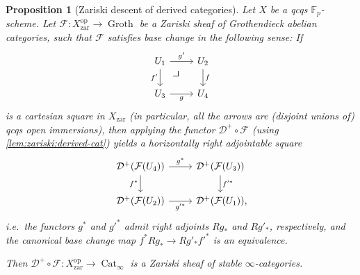 \documentclass{article}
\theoremstyle{definition}
\theoremstyle{definition}
\theoremstyle{definition}
\theoremstyle{plain}
\theoremstyle{plain}
\theoremstyle{plain}
\theoremstyle{plain}
\theoremstyle{plain}
\theoremstyle{plain}
\newtheorem{prop}[defn]{Proposition}
\theoremstyle{plain}
\theoremstyle{plain}
\theoremstyle{remark}
\theoremstyle{remark}
\theoremstyle{plain}
\theoremstyle{plain}
\theoremstyle{plain}
\theoremstyle{plain}
\theoremstyle{plain}
\newcommand{\Fp}{\mathbb{F}_p}
\newcommand{\op}[1]{#1^{\operatorname{op}}}
\newcommand{\cartsymb}{\arrow[dr, phantom,"\scalebox{1.5}{\color{black}$\lrcorner$}", near start, color=black]}
\newcommand{\Cat}[1]{\mathcal{#1}}
\newcommand{\CatInf}{\operatorname{Cat}_{\infty}}
\newcommand{\Groth}{\operatorname{Groth}}
\newcommand{\zar}{\operatorname{zar}}
\begin{document}
\begin{prop}[Zariski descent of derived categories] \label{lem:zariski:descent-on-derived}
    Let $X$ be a qcqs $\Fp$-scheme.
    Let $\Cat F \colon \op{X}_{\zar} \to \Groth$ 
    be a Zariski sheaf of Grothendieck abelian categories,
    such that $\Cat F$ satisfies base change in the following sense:
    If
    \[\begin{tikzcd}
        U_1 \ar[r, "g'"] \ar[d, "f'"'] \cartsymb & U_2 \ar[d, "f"] \\
        U_3 \ar[r, "g"'] & U_4
    \end{tikzcd}\]
    is a cartesian square in $X_{\zar}$ (in particular, all the arrows are (disjoint unions of) qcqs open immersions),
    then applying the functor $\Cat D^+ \circ \Cat F$ (using \cref{lem:zariski:derived-cat}) yields a horizontally right adjointable square
    \[\begin{tikzcd}
        \Cat D^+(\Cat F(U_4)) \ar[r, "g^*"] \ar[d, "f^*"'] & \Cat D^+(\Cat F(U_3)) \ar[d, "f'^*"] \\
        \Cat D^+(\Cat F(U_2)) \ar[r, "g'^*"'] & \Cat D^+(\Cat F(U_1)) \rlap{,}
    \end{tikzcd}\]
    i.e.\ the functors $g^*$ and $g'^*$ admit right adjoints $Rg_*$ and $Rg'_*$, respectively,
    and the canonical base change map $f^* Rg_* \to Rg'_* f'^*$ is an equivalence.

    Then $\Cat D^+\circ\Cat F \colon \op{X}_{\zar} \to \CatInf$ 
    is a Zariski sheaf of stable $\infty$-categories.
\end{prop}
\end{document}
